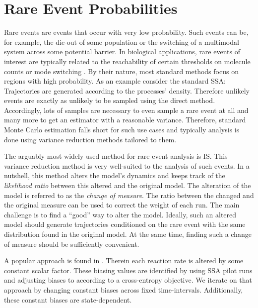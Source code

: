 \chapter{Rare Event Probabilities}\label{ch:is}
Rare events are events that occur with very low probability.
Such events can be, for example, the die-out of some population or the switching of a multimodal system across some potential barrier.
In biological applications, rare events of interest are typically related to the reachability of certain thresholds on molecule counts  or mode switching \parencite{strasser2012stability}.
By their nature, most standard methods focus on regions with high probability.
As an example consider the standard \ac{SSA}:
Trajectories are generated according to the processes' density.
Therefore unlikely events are exactly as unlikely to be sampled using the direct method.
Accordingly, lots of samples are necessary to even sample a rare event at all and many more to get an estimator with a reasonable variance.
Therefore, standard Monte Carlo estimation falls short for such use cases and typically analysis is done using variance reduction methods tailored to them.

The arguably most widely used method for rare event analysis is \acf{IS}.
This variance reduction method is very well-suited to the analysis of such events.
In a nutshell, this method alters the model's dynamics and keeps track of the \emph{likelihood ratio} between this altered and the original model.
The alteration of the model is referred to as the \emph{change of measure}.
The ratio between the changed and the original measure can be used to correct the weight of each run.
The main challenge is to find a ``good'' way to alter the model.
Ideally, such an altered model should generate trajectories conditioned on the rare event with the same distribution found in the original model.
At the same time, finding such a change of measure should be sufficiently convenient.

A popular approach is found in  \parencite{kuwahara2008efficient,daigle2011automated}.
Therein each reaction rate is altered by some constant scalar factor.
These biasing values are identified by using \ac{SSA} pilot runs and adjusting biases to according to a cross-entropy objective.
We iterate on that approach by changing constant biases across fixed time-intervals.
Additionally, these constant biases are state-dependent.


